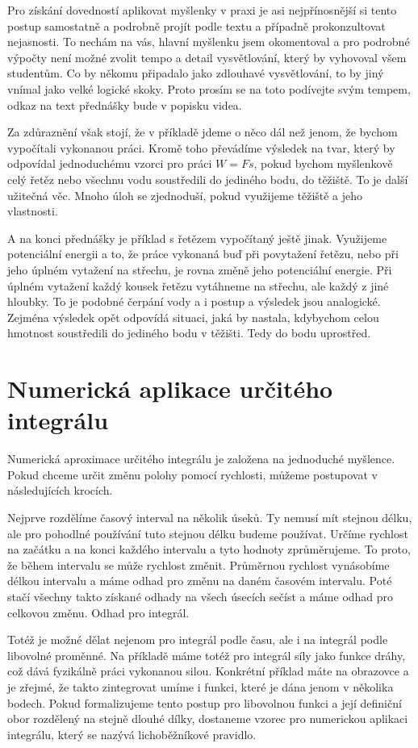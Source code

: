 \documentclass[12pt]{article}
\begin{document}
Pro získání dovedností aplikovat myšlenky v praxi je asi nejpřínosnější si tento postup samostatně a podrobně projít podle textu a případně prokonzultovat nejasnosti. To nechám na vás, hlavní myšlenku jsem okomentoval a pro podrobné výpočty není možné zvolit tempo a detail vysvětlování, který by vyhovoval všem studentům. Co by někomu připadalo jako zdlouhavé vysvětlování, to by jiný vnímal jako velké logické skoky. Proto prosím se na toto podívejte svým tempem, odkaz na text přednášky bude v popisku videa.

Za zdůraznění však stojí, že v příkladě jdeme o něco dál než jenom, že bychom vypočítali vykonanou práci. Kromě toho převádíme výsledek na tvar, který by odpovídal jednoduchému vzorci pro práci $W=Fs$, pokud bychom myšlenkově celý řetěz nebo všechnu vodu soustředili do jediného bodu, do těžiště. To je další užitečná věc. Mnoho úloh se zjednoduší, pokud využijeme těžiště a jeho vlastnosti. 

A na konci přednášky je příklad s řetězem vypočítaný ještě jinak. Využijeme potenciální energii a to, že práce vykonaná buď při povytažení řetězu, nebo při jeho úplném vytažení na střechu, je rovna změně jeho potenciální energie. Při úplném vytažení každý kousek řetězu vytáhneme na střechu, ale každý z jiné hloubky. To je podobné čerpání vody a i postup a výsledek jsou analogické. Zejména  výsledek opět odpovídá situaci, jaká by nastala, kdybychom celou hmotnost soustředili do jediného bodu v těžišti. Tedy do bodu uprostřed.

\section*{Numerická aplikace určitého integrálu}

Numerická aproximace určitého integrálu je založena na jednoduché myšlence. Pokud chceme určit změnu polohy pomocí rychlosti, můžeme postupovat v následujících krocích.

Nejprve rozdělíme časový interval na několik úseků. Ty nemusí mít stejnou délku, ale pro pohodlné používání tuto stejnou délku budeme používat. Určíme rychlost na začátku a na konci každého intervalu a tyto hodnoty zprůměrujeme. To proto, že během intervalu se může rychlost změnit. Průměrnou rychlost vynásobíme délkou intervalu a máme odhad pro změnu na daném časovém intervalu. Poté stačí všechny takto získané odhady na všech úsecích sečíst a máme odhad pro celkovou změnu. Odhad pro integrál.

Totéž je možné dělat nejenom pro integrál podle času, ale i na integrál podle libovolné proměnné. Na příkladě máme totéž pro integrál síly jako funkce dráhy, což dává fyzikálně práci vykonanou silou. Konkrétní příklad máte na obrazovce a je zřejmé, že takto zintegrovat umíme i funkci, které je dána jenom v několika bodech. Pokud formalizujeme tento postup pro libovolnou funkci a její definiční obor rozdělený na stejně dlouhé dílky, dostaneme vzorec pro numerickou aplikaci integrálu, který se nazývá lichoběžníkové pravidlo.
\end{document}
